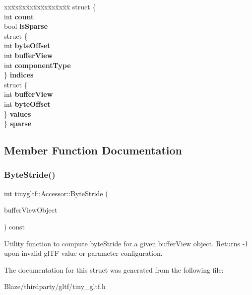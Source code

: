 \begin{DoxyCompactItemize}
\item 
\mbox{\label{structtinygltf_1_1Accessor_a5da9c34429fa6e75e60e28e245835eaa}} 
\begin{tabbing}
xx\=xx\=xx\=xx\=xx\=xx\=xx\=xx\=xx\=\kill
struct \{\\
\>int {\bfseries count}\\
\>bool {\bfseries isSparse}\\
\>struct \{\\
\>\>int {\bfseries byteOffset}\\
\>\>int {\bfseries bufferView}\\
\>\>int {\bfseries componentType}\\
\>\} {\bfseries indices}\\
\>struct \{\\
\>\>int {\bfseries bufferView}\\
\>\>int {\bfseries byteOffset}\\
\>\} {\bfseries values}\\
\} {\bfseries sparse}\\

\end{tabbing}\end{DoxyCompactItemize}


\subsection{Member Function Documentation}
\mbox{\label{structtinygltf_1_1Accessor_a31262158214af822389c28f026bcb8a2}} 
\subsubsection{\texorpdfstring{Byte\+Stride()}{ByteStride()}}
{\footnotesize\ttfamily int tinygltf\+::\+Accessor\+::\+Byte\+Stride (\begin{DoxyParamCaption}\item[{const \hyperlink{structtinygltf_1_1BufferView}{Buffer\+View} \&}]{buffer\+View\+Object }\end{DoxyParamCaption}) const\hspace{0.3cm}{\ttfamily [inline]}}

Utility function to compute byte\+Stride for a given buffer\+View object. Returns -\/1 upon invalid gl\+TF value or parameter configuration. 

The documentation for this struct was generated from the following file\+:\begin{DoxyCompactItemize}
\item 
Blaze/thirdparty/gltf/tiny\+\_\+gltf.\+h\end{DoxyCompactItemize}
